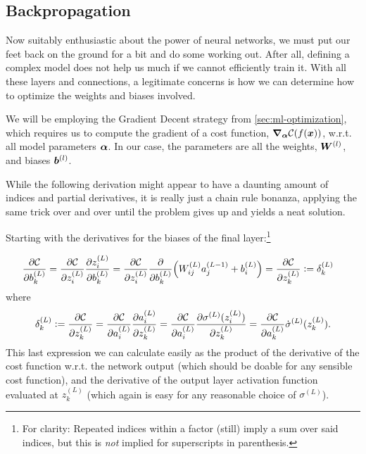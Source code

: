 \documentclass[Thesis.tex]{subfiles}
\begin{document}
\subsection{Backpropagation}
\label{sec:ml-backprop}

Now suitably enthusiastic about the power of neural networks, we must put our
feet back on the ground for a bit and do some working out. After all, defining a
complex model does not help us much if we cannot efficiently train it. With all
these layers and connections, a legitimate concerns is how we can determine how
to optimize the weights and biases involved.

We will be employing the Gradient Decent strategy from \cref{sec:ml-optimization},
which requires us to compute the gradient of a cost function,
$\grad_{\bm{\alpha}}\mathcal{C}(f(\bm{x}))$, w.r.t. all model parameters $\bm{\alpha}$. In
our case, the parameters are all the weights, $\bm{W}^{(l)}$, and biases $\bm{b}^{(l)}$.

While the following derivation might appear to have a daunting amount of indices
and partial derivatives, it is really just a chain rule bonanza, applying the
same trick over and over until the problem gives up and yields a neat
solution.

Starting with the derivatives for the biases of the final layer:\footnote{For
  clarity: Repeated indices within a factor (still) imply a sum over said
  indices, but this is \emph{not} implied for superscripts in parenthesis.}

\begin{align}
  \pdv{\mathcal{C}}{b_k^{(L)}} &=
\pdv{\mathcal{C}}{z_i^{(L)}}\pdv{z_i^{(L)}}{b_k^{(L)}}
=\pdv{\mathcal{C}}{z_i^{(L)}}\pdv{}{b_k^{(L)}}\qty(W_{ij}^{(L)}a_j^{(L-1)} +
b_i^{(L)}) = \pdv{\mathcal{C}}{z_k^{(L)}}\vcentcolon= \delta_k^{(L)}
\end{align}
where
\begin{align}
  \delta_k^{(L)}\vcentcolon= \pdv{\mathcal{C}}{z_k^{(L)}} =
\pdv{\mathcal{C}}{a^{(L)}_{i}}\pdv{a_i^{(L)}}{z_k^{(L)}} =
\pdv{\mathcal{C}}{a^{(L)}_{i}}\pdv{\sigma^{(L)}(z_i^{(L)})}{z_k^{(L)}} =
\pdv{\mathcal{C}}{a^{(L)}_{k}}\dot\sigma^{(L)}(z_k^{(L)}).
\end{align}
This last expression we can calculate easily as the product of the derivative of
the cost function w.r.t. the network output (which should be doable for any
sensible cost function), and the derivative of the output layer activation
function evaluated at $z_k^{(L)}$ (which again is easy for any reasonable choice
of $\sigma^{(L)}$).
\end{document}
